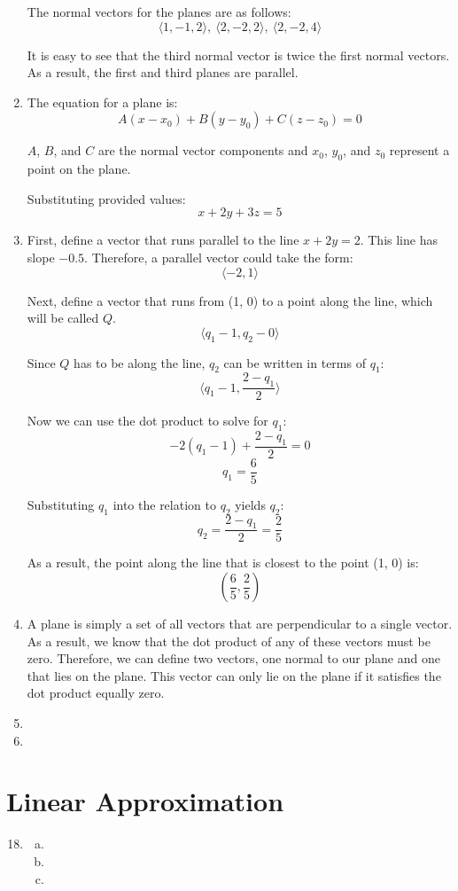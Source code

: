 \documentclass{article}
\begin{document}
\begin{enumerate}[1.]
    The normal vectors for the planes are as follows:
    $$ \langle 1, -1, 2 \rangle,\ \langle 2, -2, 2 \rangle,\ \langle 2, -2, 4
    \rangle $$

    It is easy to see that the third normal vector is twice the first normal
    vectors. As a result, the first and third planes are parallel.

  \item The equation for a plane is:
    $$ A(x - x_{0}) + B(y - y_{0}) + C(z - z_{0}) = 0 $$

    $A$, $B$, and $C$ are the normal vector components and $x_{0}$, $y_{0}$, and
    $z_{0}$ represent a point on the plane.

    \bigbreak

    Substituting provided values:
    $$ x + 2y + 3z = 5 $$

  \item First, define a vector that runs parallel to the line $x + 2y = 2$. This
    line has slope $-0.5$. Therefore, a parallel vector could take the form:
    $$ \langle -2, 1 \rangle $$

    Next, define a vector that runs from (1, 0) to a point along the line, which
    will be called $Q$.
    $$ \langle q_{1} - 1, q_{2} - 0 \rangle $$

    Since $Q$ has to be along the line, $q_{2}$ can be written in terms of
    $q_{1}$:
    $$ \Big \langle q_{1} - 1, \frac{ 2 - q_{1} }{ 2 } \Big \rangle $$

    Now we can use the dot product to solve for $q_{1}$:
    $$ -2 (q_{1} - 1) + \frac{ 2 - q_{1} }{ 2 } = 0$$
    $$ q_{1} = \frac{ 6 }{ 5 } $$

    Substituting $q_{1}$ into the relation to $q_{2}$ yields $q_{2}$:
    $$ q_{2} = \frac{ 2 - q_{1} }{ 2 } = \frac{ 2 }{ 5 } $$

    As a result, the point along the line that is closest to the point (1, 0)
    is:
    $$ \left( \frac{ 6 }{ 5 }, \frac{ 2 }{ 5 } \right) $$

  \item A plane is simply a set of all vectors that are perpendicular to a
    single vector. As a result, we know that the dot product of any of these
    vectors must be zero. Therefore, we can define two vectors, one normal to
    our plane and one that lies on the plane. This vector can only lie on the
    plane if it satisfies the dot product equally zero.

  \item
  \item
\end{enumerate}

\section{Linear Approximation}

\begin{enumerate}[1.]
  \setcounter{enumi}{17}
  \item \begin{enumerate}[a.]
      \item
      \item
      \item
    \end{enumerate}
\end{enumerate}
\end{document}
